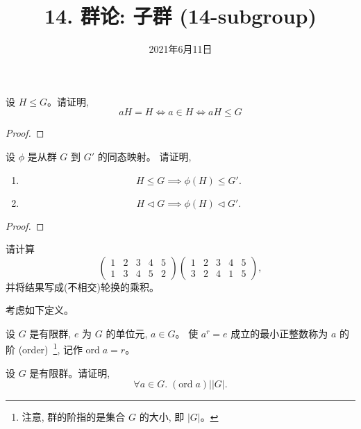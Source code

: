 \documentclass[a4paper, justified]{tufte-handout}
\title{14. 群论: 子群 (14-subgroup)}
\date{2021年6月11日}
\begin{document}
\maketitle
\noplagiarism %
\begin{abstract}
\end{abstract}
\beginrequired

\begin{problem}
  设 $H \le G$。请证明,
  \[
    aH = H \iff a \in H \iff aH \le G
  \]
\end{problem}

\begin{proof}
\end{proof}

\begin{problem}[\score{5 = 2 + 3} $\star\star\star$]
  设 $\phi$ 是从群 $G$ 到 $G'$ 的同态映射。
  请证明,
  \begin{enumerate}[(1)]
    \item
      \[
        H \le G \implies \phi(H) \le G'.
      \]
    \item
      \[
        H \triangleleft G \implies \phi(H) \triangleleft G'.
      \]
  \end{enumerate}
\end{problem}

\begin{proof}
\end{proof}

\begin{problem}
  请计算
  \[
    \begin{pmatrix}
      1 & 2 & 3 & 4 & 5 \\
      1 & 3 & 4 & 5 & 2
    \end{pmatrix}
    \begin{pmatrix}
      1 & 2 & 3 & 4 & 5 \\
      3 & 2 & 4 & 1 & 5
    \end{pmatrix},
  \]
  并将结果写成(不相交)轮换的乘积。
\end{problem}

\begin{solution}
\end{solution}

\begin{problem}
  考虑如下定义。
  \begin{definition}[元素的阶]
    设 $G$ 是有限群, $e$ 为 $G$ 的单位元, $a \in G$。
    使 $a^{r} = e$ 成立的最小正整数称为 $a$ 的阶
    (order)~\footnote{注意, 群的阶指的是集合 $G$ 的大小, 即 $|G|$。},
    记作 $\text{ord}\; a = r$。
  \end{definition}
  设 $G$ 是有限群。请证明,
  \[
    \forall a \in G.\; (\text{ord}\; a) \big\vert |G|.
  \]
\end{problem}
\end{document}
